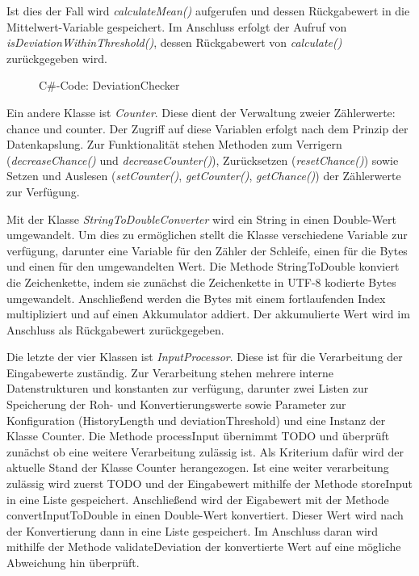     Ist dies der Fall wird \textit{calculateMean()} aufgerufen und dessen Rückgabewert in die Mittelwert-Variable gespeichert.
    Im Anschluss erfolgt der Aufruf von \textit{isDeviationWithinThreshold()}, dessen Rückgabewert von \textit{calculate()} zurückgegeben wird.
    \begin{figure}[H]
        \centering
        
        \caption{C\#-Code: DeviationChecker}
    \end{figure}    
    Ein andere Klasse ist \textit{Counter}.
    Diese dient der Verwaltung zweier Zählerwerte: chance und counter.
    Der Zugriff auf diese Variablen erfolgt nach dem Prinzip der Datenkapslung.
    Zur Funktionalität stehen Methoden zum Verrigern (\textit{decreaseChance()} und \textit{decreaseCounter()}), Zurücksetzen (\textit{resetChance()}) sowie Setzen und Auslesen (\textit{setCounter()}, \textit{getCounter()}, \textit{getChance()}) der Zählerwerte zur Verfügung.
    
    Mit der Klasse \textit{StringToDoubleConverter} wird ein String in einen Double-Wert umgewandelt.
    Um dies zu ermöglichen stellt die Klasse verschiedene Variable zur verfügung, darunter eine Variable für den Zähler der Schleife, einen für die Bytes und einen für den umgewandelten Wert.
    Die Methode StringToDouble konviert die Zeichenkette, indem sie zunächst die Zeichenkette in UTF-8 kodierte Bytes umgewandelt.
    Anschließend werden die Bytes mit einem fortlaufenden Index multipliziert und auf einen Akkumulator addiert.
    Der akkumulierte Wert wird im Anschluss als Rückgabewert zurückgegeben.
    
    Die letzte der vier Klassen ist \textit{InputProcessor}.
    Diese ist für die Verarbeitung der Eingabewerte zuständig.
    Zur Verarbeitung stehen mehrere interne Datenstrukturen und konstanten zur verfügung, darunter zwei Listen zur Speicherung der Roh- und Konvertierungswerte sowie Parameter zur Konfiguration (HistoryLength und deviationThreshold) und eine Instanz der Klasse Counter.
    Die Methode processInput übernimmt TODO und überprüft zunächst ob eine weitere Verarbeitung zulässig ist. 
    Als Kriterium dafür wird der aktuelle Stand der Klasse Counter herangezogen.
    Ist eine weiter verarbeitung zulässig wird zuerst TODO und der Eingabewert mithilfe der Methode storeInput in eine Liste gespeichert.
    Anschließend wird der Eigabewert mit der Methode convertInputToDouble in einen Double-Wert konvertiert.
    Dieser Wert wird nach der Konvertierung dann in eine Liste gespeichert.
    Im Anschluss daran wird mithilfe der Methode validateDeviation der konvertierte Wert auf eine mögliche Abweichung hin überprüft.
